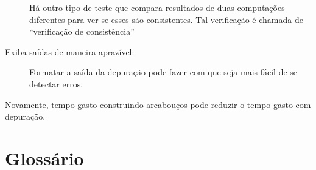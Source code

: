 \begin{description}

Há outro tipo de teste que compara resultados de duas computações diferentes para ver se esses são consistentes. Tal verificação é chamada de ``verificação de consistência''

\item[Exiba saídas de maneira aprazível:] Formatar a saída da depuração pode fazer com que seja mais fácil de se detectar erros.

\end{description}

Novamente, tempo gasto construindo arcabouços pode reduzir o tempo gasto com depuração.


\section{Glossário}

